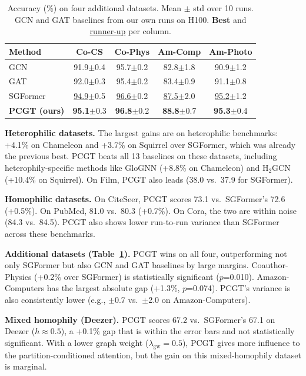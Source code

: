 \documentclass[sigconf]{acmart}
\newcommand{\best}[1]{\textcolor{bestcolor}{\textbf{#1}}}
\newcommand{\runup}[1]{\textcolor{runnerup}{\underline{#1}}}
\begin{document}
\begin{table}[t]
\centering
\small
\setlength{\tabcolsep}{3pt}
\begin{tabular}{l|cccc}
\toprule
\textbf{Method} & \textbf{Co-CS} & \textbf{Co-Phys} & \textbf{Am-Comp} & \textbf{Am-Photo} \\
\midrule
GCN & 91.9{\scriptsize$\pm$0.4} & 95.7{\scriptsize$\pm$0.2} & 82.8{\scriptsize$\pm$1.8} & 90.9{\scriptsize$\pm$1.2} \\
GAT & 92.0{\scriptsize$\pm$0.3} & 95.4{\scriptsize$\pm$0.2} & 83.4{\scriptsize$\pm$0.9} & 91.1{\scriptsize$\pm$0.8} \\
SGFormer & \runup{94.9}{\scriptsize$\pm$0.5} & \runup{96.6}{\scriptsize$\pm$0.2} & \runup{87.5}{\scriptsize$\pm$2.0} & \runup{95.2}{\scriptsize$\pm$1.2} \\
\textbf{PCGT (ours)} & \best{95.1}{\scriptsize$\pm$0.3} & \best{96.8}{\scriptsize$\pm$0.2} & \best{88.8}{\scriptsize$\pm$0.7} & \best{95.3}{\scriptsize$\pm$0.4} \\
\bottomrule
\end{tabular}
\caption{Accuracy (\%) on four additional datasets. Mean $\pm$ std over 10 runs. GCN and GAT baselines from our own runs on H100. \best{Best} and \runup{runner-up} per column.}
\label{tab:new_datasets}
\end{table}

\textbf{Heterophilic datasets.} The largest gains are on heterophilic benchmarks: +4.1\% on Chameleon and +3.7\% on Squirrel over SGFormer, which was already the previous best. PCGT beats all 13 baselines on these datasets, including heterophily-specific methods like GloGNN (+8.8\% on Chameleon) and H$_2$GCN (+10.4\% on Squirrel). On Film, PCGT also leads (38.0 vs.\ 37.9 for SGFormer).

\textbf{Homophilic datasets.} On CiteSeer, PCGT scores 73.1 vs.\ SGFormer's 72.6 (+0.5\%). On PubMed, 81.0 vs.\ 80.3 (+0.7\%). On Cora, the two are within noise (84.3 vs.\ 84.5). PCGT also shows lower run-to-run variance than SGFormer across these benchmarks.

\textbf{Additional datasets (Table~\ref{tab:new_datasets}).} PCGT wins on all four, outperforming not only SGFormer but also GCN and GAT baselines by large margins. Coauthor-Physics (+0.2\% over SGFormer) is statistically significant ($p$=0.010). Amazon-Computers has the largest absolute gap (+1.3\%, $p$=0.074). PCGT's variance is also consistently lower (e.g., $\pm$0.7 vs.\ $\pm$2.0 on Amazon-Computers).

\textbf{Mixed homophily (Deezer).} PCGT scores 67.2 vs.\ SGFormer's 67.1 on Deezer ($h \approx 0.5$), a +0.1\% gap that is within the error bars and not statistically significant. With a lower graph weight ($\lambda_{\text{gw}}=0.5$), PCGT gives more influence to the partition-conditioned attention, but the gain on this mixed-homophily dataset is marginal.
\end{document}
